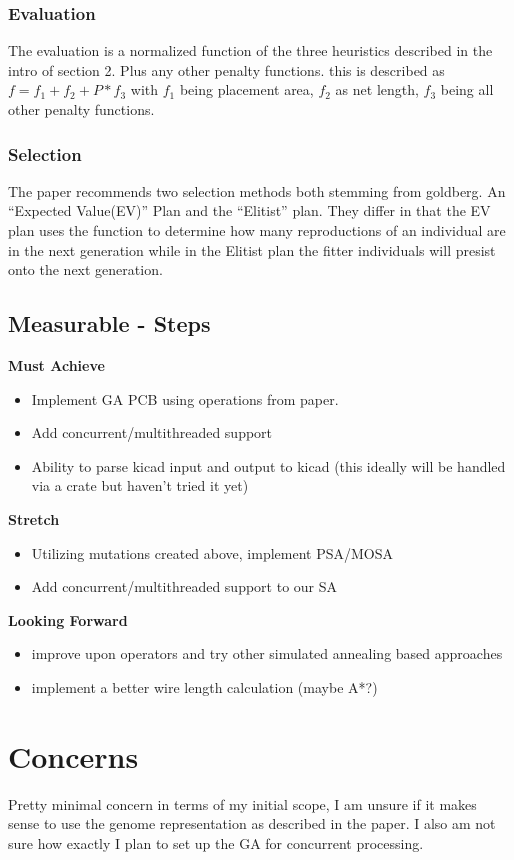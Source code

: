 \documentclass{article}
\begin{document}
\subsubsection{Evaluation}
The evaluation is a normalized function of the three heuristics described in the intro of section 2. Plus any other penalty functions. this is described as $f = f_1 + f_2 + P * f_3$ with $f_1$ being placement area, $f_2$ as net length, $f_3$ being all other penalty functions. 

\subsubsection{Selection}
The paper recommends two selection methods both stemming from goldberg. An ``Expected Value(EV)'' Plan and the ``Elitist'' plan. They differ in that the EV plan uses the function to determine how many reproductions of an individual are in the next generation while in the Elitist plan the fitter individuals will presist onto the next generation.


\subsection{Measurable - Steps }

\noindent\textbf{Must Achieve}
\begin{itemize}

    \item Implement GA PCB using operations from paper. 
    \item Add concurrent/multithreaded support
    \item Ability to parse kicad input and output to kicad (this ideally will be handled via a crate but haven't tried it yet)
\end{itemize}


\noindent\textbf{Stretch}
\begin{itemize}
    \item Utilizing mutations created above, implement PSA/MOSA 
    \item Add concurrent/multithreaded support to our SA 
\end{itemize}

\noindent\textbf{Looking Forward}
\begin{itemize}
    \item improve upon operators and try other simulated annealing based approaches
    \item implement a better wire length calculation (maybe A*?)
\end{itemize}

\section{Concerns}
Pretty minimal concern in terms of my initial scope, I am unsure if it makes sense to use the genome representation as described in the paper. I also am not sure how exactly I plan to set up the GA for concurrent processing. 
\end{document}
